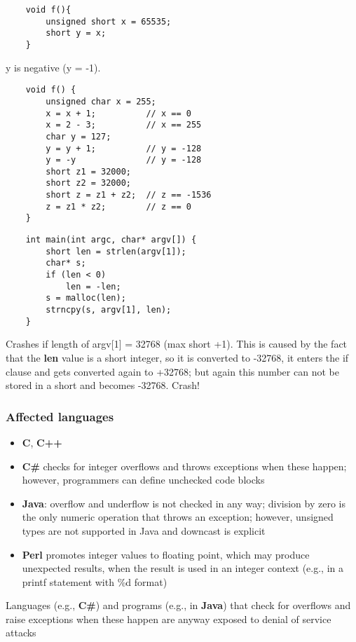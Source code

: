 \documentclass[a4paper, 10pt, titlepage]{article}
\begin{document}
\begin{lstlisting}
	void f(){
		unsigned short x = 65535;
		short y = x;
	}
\end{lstlisting}
y is negative (y = -1).
\begin{lstlisting}
	void f() {
		unsigned char x = 255;
		x = x + 1; 			// x == 0
		x = 2 - 3; 			// x == 255
		char y = 127;
		y = y + 1; 			// y = -128
		y = -y				// y = -128
		short z1 = 32000;
		short z2 = 32000;
		short z = z1 + z2; 	// z == -1536
		z = z1 * z2;		// z == 0
	}
\end{lstlisting}
\begin{lstlisting}
	int main(int argc, char* argv[]) {
		short len = strlen(argv[1]);
		char* s;
		if (len < 0)
			len = -len;
		s = malloc(len);
		strncpy(s, argv[1], len);
	}
\end{lstlisting}
Crashes if length of argv[1] = 32768 (max short +1). This is caused by the fact that the \textbf{len} value is a short integer, so it is converted to -32768, it enters the if clause and gets converted again to +32768; but again this number can not be stored in a short and becomes -32768. Crash! \medskip

\subsubsection*{Affected languages}
\begin{itemize}
\item \textbf{C}, \textbf{C++}
\item \textbf{C\#} checks for integer overflows and throws exceptions when these happen; however, programmers can define unchecked code blocks
\item \textbf{Java}: overflow and underflow is not checked in any way; division by zero is the only numeric operation that throws an exception; however, unsigned types are not supported in Java and downcast is explicit
\item \textbf{Perl} promotes integer values to floating point, which may produce unexpected results, when the result is used in an integer
context (e.g., in a printf statement with \%d format)
\end{itemize}
Languages (e.g., \textbf{C\#}) and programs (e.g., in \textbf{Java}) that check for overflows and raise exceptions when these happen are anyway exposed to denial of service attacks

\newpage
\end{document}
